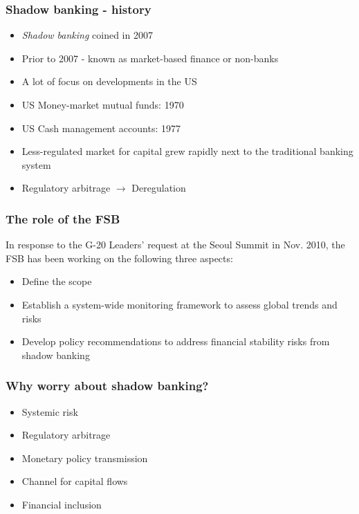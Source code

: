 \documentclass[11pt]{beamer}
\begin{document}
\begin{frame}
\frametitle{Shadow banking - history}
\begin{itemize}
\item \textit{Shadow banking} coined in 2007
\item Prior to 2007 - known as market-based finance or non-banks
\item A lot of focus on developments in the US
\item US Money-market mutual funds: 1970
\item US Cash management accounts: 1977
\item Less-regulated market for capital grew rapidly next to the traditional banking system
\item Regulatory arbitrage
$\rightarrow$ Deregulation
\end{itemize}
\end{frame}





\begin{frame}
\frametitle{The role of the FSB}
In response to the G-20 Leaders’ request at the Seoul Summit in Nov. 2010, the FSB has been working on the following three aspects:
\begin{itemize}
\item Define the scope
\item Establish a system-wide monitoring framework to assess global trends and risks
\item Develop policy recommendations to address financial stability risks from shadow banking
\end{itemize}
\end{frame}

\begin{frame}
\frametitle{Why worry about shadow banking?}
\begin{itemize}
\item Systemic risk
\item Regulatory arbitrage
\item Monetary policy transmission
\item Channel for capital flows
\item Financial inclusion

\end{itemize}
\end{frame}



\begin{frame}
\begin{center}
\end{center}
\end{frame}
\end{document}
